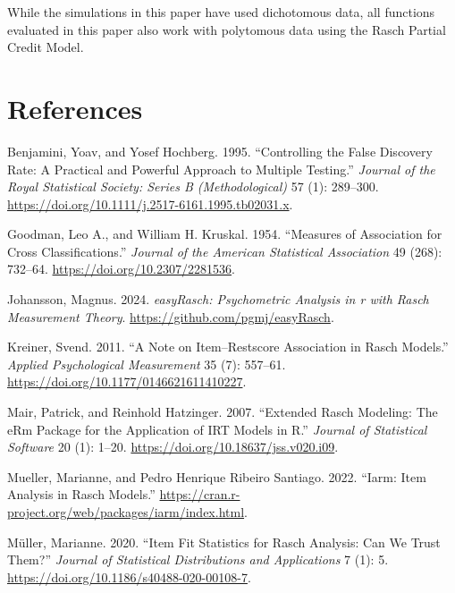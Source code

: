 \documentclass[
  letterpaper,
  DIV=11,
  numbers=noendperiod]{scrartcl}
\newlength{\cslhangindent}
\newenvironment{CSLReferences}[2] %
 {\begin{list}{}{%
  \setlength{\itemindent}{0pt}
  \setlength{\leftmargin}{0pt}
  \setlength{\parsep}{0pt}
  \ifodd #1
   \setlength{\leftmargin}{\cslhangindent}
   \setlength{\itemindent}{-1\cslhangindent}
  \fi
  \setlength{\itemsep}{#2\baselineskip}}}
 {\end{list}}
\begin{document}
While the simulations in this paper have used dichotomous data, all
functions evaluated in this paper also work with polytomous data using
the Rasch Partial Credit Model.

\section*{References}\label{references}

\label{refs}
\begin{CSLReferences}{1}{0}
Benjamini, Yoav, and Yosef Hochberg. 1995. {``Controlling the {False}
{Discovery} {Rate}: {A} {Practical} and {Powerful} {Approach} to
{Multiple} {Testing}.''} \emph{Journal of the Royal Statistical Society:
Series B (Methodological)} 57 (1): 289--300.
\url{https://doi.org/10.1111/j.2517-6161.1995.tb02031.x}.

Goodman, Leo A., and William H. Kruskal. 1954. {``Measures of
{Association} for {Cross} {Classifications}.''} \emph{Journal of the
American Statistical Association} 49 (268): 732--64.
\url{https://doi.org/10.2307/2281536}.

Johansson, Magnus. 2024. \emph{easyRasch: Psychometric Analysis in r
with Rasch Measurement Theory}. \url{https://github.com/pgmj/easyRasch}.

Kreiner, Svend. 2011. {``A {Note} on {Item}--{Restscore} {Association}
in {Rasch} {Models}.''} \emph{Applied Psychological Measurement} 35 (7):
557--61. \url{https://doi.org/10.1177/0146621611410227}.

Mair, Patrick, and Reinhold Hatzinger. 2007. {``Extended {Rasch}
{Modeling}: {The} {eRm} {Package} for the {Application} of {IRT}
{Models} in {R}.''} \emph{Journal of Statistical Software} 20 (1):
1--20. \url{https://doi.org/10.18637/jss.v020.i09}.

Mueller, Marianne, and Pedro Henrique Ribeiro Santiago. 2022. {``Iarm:
{Item} {Analysis} in {Rasch} {Models}.''}
\url{https://cran.r-project.org/web/packages/iarm/index.html}.

Müller, Marianne. 2020. {``Item Fit Statistics for {Rasch} Analysis: Can
We Trust Them?''} \emph{Journal of Statistical Distributions and
Applications} 7 (1): 5.
\url{https://doi.org/10.1186/s40488-020-00108-7}.


\end{CSLReferences}
\end{document}
